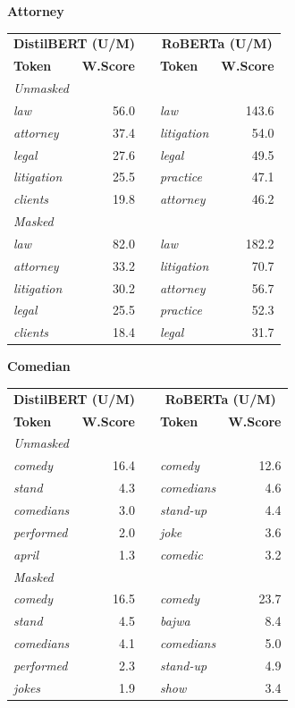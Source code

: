 \documentclass[11pt]{article}
\begin{document}
\vspace{4pt}\noindent\textbf{Attorney}
\begin{center}\scriptsize
\begin{tabular}{lrllr}
\toprule
\multicolumn{2}{c}{\textbf{DistilBERT (U/M)}} & & \multicolumn{2}{c}{\textbf{RoBERTa (U/M)}} \\
\textbf{Token} & \textbf{W.Score} & & \textbf{Token} & \textbf{W.Score} \\
\midrule
\multicolumn{5}{l}{\textit{Unmasked}} \\
\emph{law} & 56.0 & & \emph{law} & 143.6 \\
\emph{attorney} & 37.4 & & \emph{litigation} & 54.0 \\
\emph{legal} & 27.6 & & \emph{legal} & 49.5 \\
\emph{litigation} & 25.5 & & \emph{practice} & 47.1 \\
\emph{clients} & 19.8 & & \emph{attorney} & 46.2 \\
\multicolumn{5}{l}{\textit{Masked}} \\
\emph{law} & 82.0 & & \emph{law} & 182.2 \\
\emph{attorney} & 33.2 & & \emph{litigation} & 70.7 \\
\emph{litigation} & 30.2 & & \emph{attorney} & 56.7 \\
\emph{legal} & 25.5 & & \emph{practice} & 52.3 \\
\emph{clients} & 18.4 & & \emph{legal} & 31.7 \\
\bottomrule
\end{tabular}
\end{center}

\vspace{4pt}\noindent\textbf{Comedian}
\begin{center}\scriptsize
\begin{tabular}{lrllr}
\toprule
\multicolumn{2}{c}{\textbf{DistilBERT (U/M)}} & & \multicolumn{2}{c}{\textbf{RoBERTa (U/M)}} \\
\textbf{Token} & \textbf{W.Score} & & \textbf{Token} & \textbf{W.Score} \\
\midrule
\multicolumn{5}{l}{\textit{Unmasked}} \\
\emph{comedy} & 16.4 & & \emph{comedy} & 12.6 \\
\emph{stand} & 4.3 & & \emph{comedians} & 4.6 \\
\emph{comedians} & 3.0 & & \emph{stand-up} & 4.4 \\
\emph{performed} & 2.0 & & \emph{joke} & 3.6 \\
\emph{april} & 1.3 & & \emph{comedic} & 3.2 \\
\multicolumn{5}{l}{\textit{Masked}} \\
\emph{comedy} & 16.5 & & \emph{comedy} & 23.7 \\
\emph{stand} & 4.5 & & \emph{bajwa} & 8.4 \\
\emph{comedians} & 4.1 & & \emph{comedians} & 5.0 \\
\emph{performed} & 2.3 & & \emph{stand-up} & 4.9 \\
\emph{jokes} & 1.9 & & \emph{show} & 3.4 \\
\bottomrule
\end{tabular}
\end{center}
\end{document}
